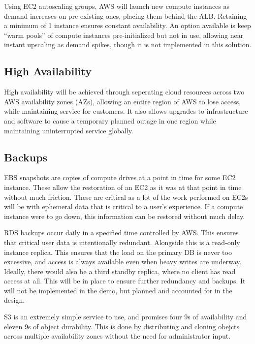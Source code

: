 Using EC2 autoscaling groups, AWS will launch new compute instances as demand increases on pre-existing ones, placing them behind the ALB. Retaining a minimum of 1 instance ensures constant availability. An option available is keep ``warm pools'' of compute instances pre-initialized but not in use, allowing near instant upscaling as demand spikes, though it is not implemented in this solution.

\subsection{High Availability}

High availability will be achieved through seperating cloud resources across two AWS availability zones (AZs), allowing an entire region of AWS to lose access, while maintaining service for customers. It also allows upgrades to infrastructure and software to cause a temporary planned outage in one region while maintaining uninterrupted service globally.

\subsection{Backups}

EBS snapshots are copies of compute drives at a point in time for some EC2 instance. These allow the restoration of an EC2 as it was at that point in time without much friction. These are critical as a lot of the work performed on EC2s will be with ephemeral data that is critical to a user's experience. If a compute instance were to go down, this information can be restored without much delay.

RDS backups occur daily in a specified time controlled by AWS. This ensures that critical user data is intentionally redundant. Alongside this is a read-only instance replica. This ensures that the load on the primary DB is never too excessive, and access is always available even when heavy writes are underway. Ideally, there would also be a third standby replica, where no client has read access at all. This will be in place to ensure further redundancy and backups. It will not be implemented in the demo, but planned and accounted for in the design.

S3 is an extremely simple service to use, and promises four 9s of availability and eleven 9s of object durability. This is done by distributing and cloning obejcts across multiple availability zones without the need for administrator input.
